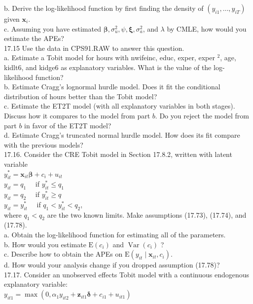 \documentclass[10pt]{article}
\begin{document}
b. Derive the log-likelihood function by first finding the density of $\left(y_{i 1}, \ldots, y_{i T}\right)$ given $\mathbf{x}_{i}$.\\
c. Assuming you have estimated $\boldsymbol{\beta}, \sigma_{u}^{2}, \psi, \boldsymbol{\xi}, \sigma_{a}^{2}$, and $\lambda$ by CMLE, how would you estimate the APEs?\\
17.15 Use the data in CPS91.RAW to answer this question.\\
a. Estimate a Tobit model for hours with nwifeinc, educ, exper, exper ${ }^{2}$, age, kidlt6, and kidge6 as explanatory variables. What is the value of the log-likelihood function?\\
b. Estimate Cragg's lognormal hurdle model. Does it fit the conditional distribution of hours better than the Tobit model?\\
c. Estimate the ET2T model (with all explanatory variables in both stages). Discuss how it compares to the model from part $b$. Do you reject the model from part $b$ in favor of the ET2T model?\\
d. Estimate Cragg's truncated normal hurdle model. How does its fit compare with the previous models?\\
17.16. Consider the CRE Tobit model in Section 17.8.2, written with latent variable\\
$y_{i t}^{*}=\mathbf{x}_{i t} \boldsymbol{\beta}+c_{i}+u_{i t}$\\
$y_{i t}=q_{1} \quad$ if $y_{i t}^{*} \leq q_{1}$\\
$y_{i t}=q_{2} \quad$ if $y_{i t}^{*} \geq q$\\
$y_{i t}=y_{i t}^{*} \quad$ if $q_{1}<y_{i t}^{*}<q_{2}$,\\
where $q_{1}<q_{2}$ are the two known limits. Make assumptions (17.73), (17.74), and (17.78).\\
a. Obtain the log-likelihood function for estimating all of the parameters.\\
b. How would you estimate $\mathrm{E}\left(c_{i}\right)$ and $\operatorname{Var}\left(c_{i}\right)$ ?\\
c. Describe how to obtain the APEs on $\mathrm{E}\left(y_{i t} \mid \mathbf{x}_{i t}, c_{i}\right)$.\\
d. How would your analysis change if you dropped assumption (17.78)?\\
17.17. Consider an unobserved effects Tobit model with a continuous endogenous explanatory variable:\\
$y_{i t 1}=\max \left(0, \alpha_{1} y_{i t 2}+\mathbf{z}_{i t 1} \boldsymbol{\delta}+c_{i 1}+u_{i t 1}\right)$\\
\end{document}
